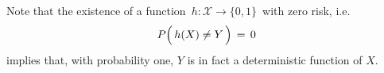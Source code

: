 \begin{remark}
\mbox{}\vskip 0.1cm
\noindent
Note that the existence of a function \,$h : \mathcal{X} \longrightarrow \{0,1\}$\,
with zero risk, i.e.
\begin{equation*}
P\!\left(\,h(X) \overset{{\color{white}.}}{\neq} Y \,\right) \,=\, 0
\end{equation*}
implies that, with probability one, $Y$ is in fact a deterministic function of $X$.
\end{remark}


\renewcommand{\theenumi}{\roman{enumi}}
\renewcommand{\labelenumi}{\textnormal{(\theenumi)}$\;\;$}

